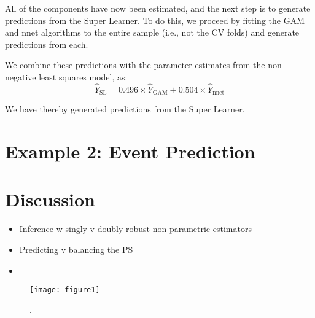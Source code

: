 \documentclass[12pt]{article}
\begin{document}
All of the components have now been estimated, and the next step is to generate predictions from the Super Learner. To do this, we proceed by fitting the GAM and nnet algorithms to the entire sample (i.e., not the CV folds) and generate predictions from each.

We combine these predictions with the parameter estimates from the non-negative least squares model, as:
\begin{equation}
	\hat{Y}_{\text{SL}} = 0.496\times \hat{Y}_{\text{GAM}} + 0.504 \times \hat{Y}_{\text{nnet}}
\end{equation}

We have thereby generated predictions from the Super Learner.

\section*{Example 2: Event Prediction}



\section*{Discussion}

\begin{itemize}
	\item Inference w singly v doubly robust non-parametric estimators
	\item Predicting v balancing the PS
	\item 
\end{itemize}

\newpage

\begin{figure}[!p]
\centering\texttt{[image: figure1]}
\caption{.}\label{F1}
\end{figure}


\newpage


\end{document}
